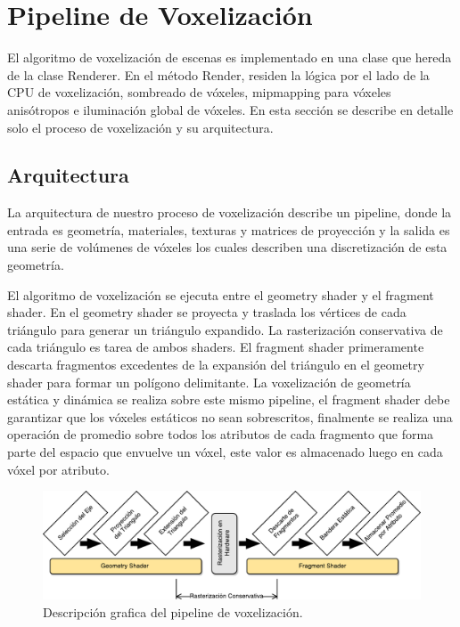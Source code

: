 \section{Pipeline de Voxelización} %
\label{sec:pipeline_de_voxelizacion}
El algoritmo de voxelización de escenas es implementado en una clase que hereda de la clase Renderer. En el método Render, residen la lógica por el lado de la CPU de voxelización, sombreado de vóxeles, mipmapping para vóxeles anisótropos e iluminación global de vóxeles. En esta sección se describe en detalle solo el proceso de voxelización y su arquitectura.
\subsection{Arquitectura}

La arquitectura de nuestro proceso de voxelización describe un pipeline, donde la entrada es geometría, materiales, texturas y matrices de proyección y la salida es una serie de volúmenes de vóxeles los cuales describen una discretización de esta geometría.

El algoritmo de voxelización se ejecuta entre el geometry shader y el fragment shader. En el geometry shader se proyecta y traslada los vértices de cada triángulo para generar un triángulo expandido. La rasterización conservativa de cada triángulo es tarea de ambos shaders. El fragment shader primeramente descarta fragmentos excedentes de la expansión del triángulo en el geometry shader para formar un polígono delimitante. La voxelización de geometría estática y dinámica se realiza sobre este mismo pipeline, el fragment shader debe garantizar que los vóxeles estáticos no sean sobrescritos, finalmente se realiza una operación de promedio sobre todos los atributos de cada fragmento que forma parte del espacio que envuelve un vóxel, este valor es almacenado luego en cada vóxel por atributo.
\begin{figure}[H]
    \centering
    \includegraphics[width=\linewidth]{media/voxel_pipeline_cropped.pdf}
    \caption{Descripción grafica del pipeline de voxelización.}
\end{figure}


